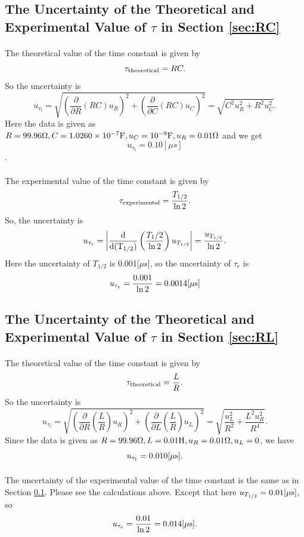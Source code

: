 \documentclass{my_template}
\begin{document}
    \subsection{The Uncertainty of the Theoretical and Experimental Value of $\tau$ in Section \ref{sec:RC}}\label{sec:u1}
    \paragraph{} The theoretical value of the time constant is given by \[\tau_{\rm theoretical}=RC.\] So the uncertainty is \[u_{\tau_t}=\sqrt{\left(\frac{\partial}{\partial R}(RC)u_R\right)^2+\left(\frac{\partial}{\partial C}(RC)u_C\right)^2}=\sqrt{C^2u_R^2+R^2u_C^2}.\] Here the data is given as \(R=99.96\Omega, C=1.0260\times 10^{-7}{\rm F}, u_C=10^{-9}{\rm F}, u_R=0.01\Omega\) and we get \[u_{\tau_t}=0.10[\mu s]\].
    \vspace{-5mm}
    \paragraph{} The experimental value of the time constant is given by \[\tau_{\rm experimental}=\frac{T_{1/2}}{\ln 2}.\] So, the uncertainty is \[u_{\tau_e}=\left|\frac{\rm d}{\rm d (T_{1/2})}\left(\frac{T_1/2}{\ln 2}\right)u_{T_{1/2}}\right|=\frac{u_{T_{1/2}}}{\ln 2}.\] Here the uncertainty of $T_{1/2} $ is 0.001$[\mu$s], so the uncertainty of $\tau_e$ is \[u_{\tau_e}=\frac{0.001}{\ln 2}=0.0014[\mu \rm s]\]
    \subsection{The Uncertainty of the Theoretical and Experimental Value of $\tau$ in Section \ref{sec:RL}}
    \paragraph{}The theoretical value of the time constant is given by \[\tau_{\rm theoretical}=\frac{L}{R}.\] So the uncertainty is \[u_{\tau_t}=\sqrt{\left(\frac{\partial}{\partial R}\left(\frac{L}{R}\right)u_R\right)^2+\left(\frac{\partial}{\partial L}\left(\frac{L}{R}\right)u_L\right)^2}=\sqrt{\frac{u_L^2}{R^2}+\frac{L^2u_R^2}{R^4}}.\] Since the data is given as \(R=99.96\Omega,L=0.01{\rm H},u_R=0.01\Omega,u_L=0\), we have \[u_{\tau_t}=0.010[\mu \rm s].\]
    \vspace{-5mm}
    \paragraph{} The uncertainty of the experimental value of the time constant is the same as in Section \ref{sec:u1}. Please see the calculations above. Except that here $u_{T_{1/2}}=0.01[\mu\rm s]$, so $$u_{\tau_e}=\frac{0.01}{\ln 2}=0.014[\mu\rm s].$$ 
\end{document}

